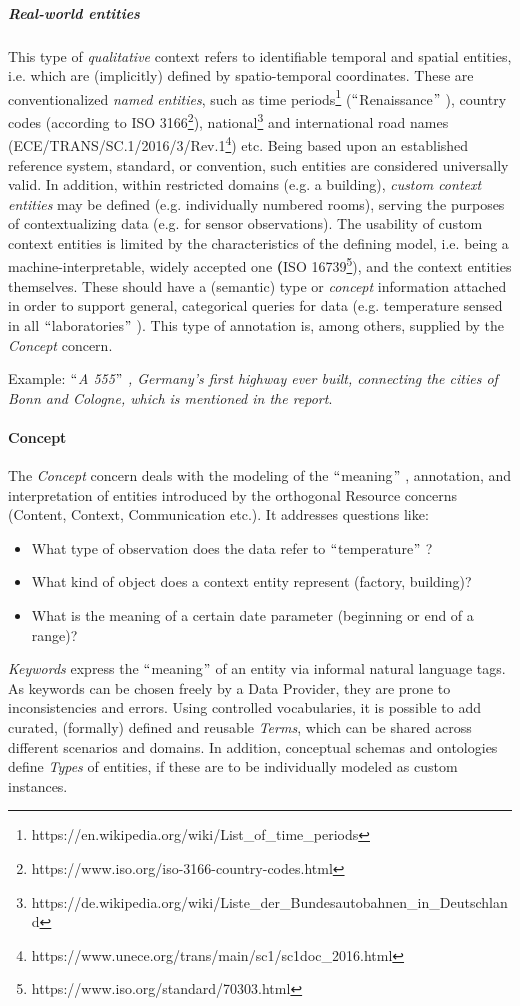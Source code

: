 \subparagraph*{Real-world entities}
This type of \textit{qualitative} context refers to identifiable temporal and spatial entities, i.e. which are (implicitly) defined by spatio-temporal coordinates. These are conventionalized \textit{named entities}, such as time periods\footnote{https://en.wikipedia.org/wiki/List\_of\_time\_periods } ($``$Renaissance$"$ ), country codes (according to ISO 3166\footnote{https://www.iso.org/iso-3166-country-codes.html }), national\footnote{https://de.wikipedia.org/wiki/Liste\_der\_Bundesautobahnen\_in\_Deutschland } and international road names (ECE/TRANS/SC.1/2016/3/Rev.1\footnote{https://www.unece.org/trans/main/sc1/sc1doc\_2016.html }) etc. Being based upon an established reference system, standard, or convention, such entities are considered universally valid. In addition, within restricted domains (e.g. a building), \textit{custom context entities} may be defined (e.g. individually numbered rooms), serving the purposes of contextualizing data (e.g. for sensor observations). The usability of custom context entities is limited by the characteristics of the defining model, i.e. being a machine-interpretable, widely accepted one \textbf{(}ISO 16739\footnote{https://www.iso.org/standard/70303.html }), and the context entities themselves. These should have a (semantic) type or \textit{concept} information attached in order to support general, categorical queries for data (e.g. temperature sensed in all $``$laboratories$"$ ). This type of annotation is, among others, supplied by the \textit{Concept }concern. 

Example: \textit{$``$A 555$"$ , Germany’s first highway ever built, connecting the cities of Bonn and Cologne, which is mentioned in the report}. 

\paragraph{Concept\\}
 The \textit{Concept }concern deals with the modeling of the $``$meaning$"$ , annotation, and interpretation of entities introduced by the orthogonal Resource concerns (Content, Context, Communication etc.). It addresses questions like:  \begin{itemize}
	\item What type of observation does the data refer to $``$temperature$"$  ? 
 	\item What kind of object does a context entity represent (factory, building)? 
 	\item What is the meaning of a certain date parameter (beginning or end of a range)?
\end{itemize} 
 \textit{Keywords }express the $``$meaning$"$  of an entity via informal natural language tags. As keywords can be chosen freely by a Data Provider, they are prone to inconsistencies and errors. Using controlled vocabularies, it is possible to add curated, (formally) defined and reusable \textit{Terms}, which can be shared across different scenarios and domains. In addition, conceptual schemas and ontologies define \textit{Types} of entities, if these are to be individually modeled as custom instances.  

